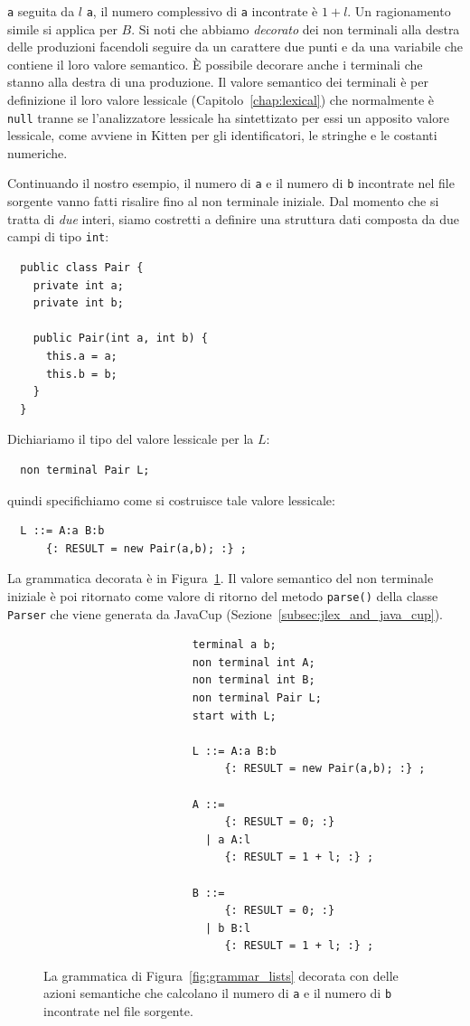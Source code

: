\texttt{a} seguita da $l$ \texttt{a}, il numero complessivo di \texttt{a}
incontrate \`e $1 + l$. Un ragionamento simile si applica per $B$.
Si noti che abbiamo \emph{decorato} dei non terminali alla destra delle
produzioni facendoli seguire da un carattere due punti e da una variabile
che contiene il loro valore semantico. \`E possibile decorare anche i terminali
che stanno alla destra di una produzione. Il valore semantico dei terminali
\`e per definizione il loro valore lessicale (Capitolo~\ref{chap:lexical})
che normalmente \`e \texttt{null} tranne se l'analizzatore lessicale
ha sintettizato per essi un apposito valore lessicale, come avviene in Kitten
per gli identificatori, le stringhe e le costanti numeriche.

Continuando il nostro esempio, il numero di \texttt{a} e il numero di
\texttt{b} incontrate nel file sorgente vanno fatti risalire fino al
non terminale iniziale. Dal momento che si tratta di \emph{due} interi,
siamo costretti a definire una struttura dati composta da due campi
di tipo \texttt{int}:
%
\begin{verbatim}
  public class Pair {
    private int a;
    private int b;

    public Pair(int a, int b) {
      this.a = a;
      this.b = b;
    }
  }
\end{verbatim}
%
Dichiariamo il tipo del valore lessicale per la $L$:
%
\begin{verbatim}
  non terminal Pair L;
\end{verbatim}
%
quindi specifichiamo come si costruisce tale valore lessicale:
%
\begin{verbatim}
  L ::= A:a B:b
      {: RESULT = new Pair(a,b); :} ;
\end{verbatim}
%
La grammatica decorata \`e in Figura~\ref{fig:grammar_lists_decoration}.
Il valore semantico del non terminale iniziale \`e poi ritornato
come valore di ritorno del metodo \texttt{parse()} della classe
\texttt{Parser} che viene generata da JavaCup
(Sezione~\ref{subsec:jlex_and_java_cup}).
%
\begin{figure}[t]
\begin{verbatim}
                       terminal a b;
                       non terminal int A;
                       non terminal int B;
                       non terminal Pair L;
                       start with L;

                       L ::= A:a B:b
                            {: RESULT = new Pair(a,b); :} ;

                       A ::=
                            {: RESULT = 0; :}
                         | a A:l
                            {: RESULT = 1 + l; :} ;

                       B ::=
                            {: RESULT = 0; :}
                         | b B:l
                            {: RESULT = 1 + l; :} ;
\end{verbatim}
\caption{La grammatica di Figura~\ref{fig:grammar_lists} decorata con delle
         azioni semantiche che calcolano il numero di \texttt{a} e il numero
         di \texttt{b} incontrate nel file sorgente.}
  \label{fig:grammar_lists_decoration}
\end{figure}

